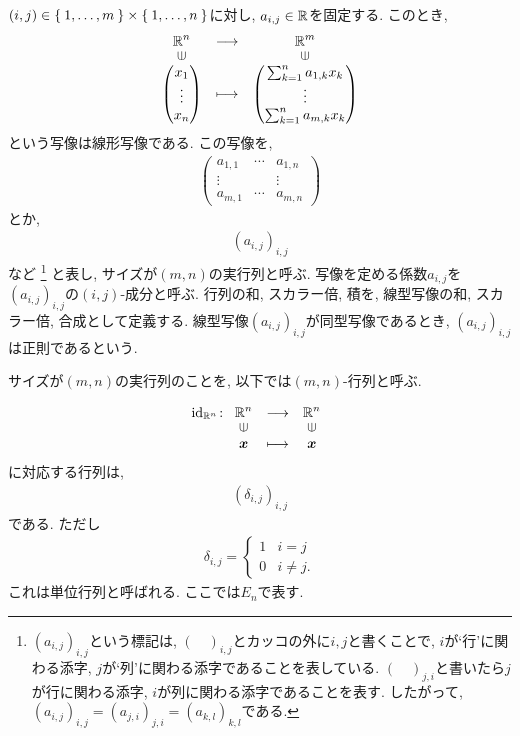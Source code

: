 \begin{definition}
$(i,j)\in\Set{1,\ldots,m}\times \Set{1,\ldots,n}$に対し,
$a_{i,j}\in\mathbb{R}$を固定する.
このとき,
\begin{align*}
  \Shazo{\RR^n}{\RR^m}
        {\begin{pmatrix}x_1\\\vdots\\x_n\end{pmatrix}}{\begin{pmatrix}\sum_{k=1}^n a_{1,k}x_k\\\vdots\\\sum_{k=1}^n a_{m,k}x_k\end{pmatrix}}
\end{align*}
という写像は線形写像である.
この写像を,
\begin{align*}
  \begin{pmatrix}
    a_{1,1}&\cdots &a_{1,n}\\
    \vdots& &\vdots\\
    a_{m,1}&\cdots &a_{m,n}
  \end{pmatrix}
\end{align*}
とか,
\begin{align*}
  (a_{i,j})_{i,j}
\end{align*}
など%
\footnote{$(a_{i,j})_{i,j}$という標記は, $(\quad)_{i,j}$とカッコの外に$i,j$と書くことで, $i$が`行'に関わる添字, $j$が`列'に関わる添字であることを表している.
$(\quad)_{j,i}$と書いたら$j$が行に関わる添字, $i$が列に関わる添字であることを表す.
したがって, $(a_{i,j})_{i,j}=(a_{j,i})_{j,i}=(a_{k,l})_{k,l}$である.}%
と表し,
サイズが$(m,n)$の実行列と呼ぶ.
写像を定める係数$a_{i,j}$を
$(a_{i,j})_{i,j}$の$(i,j)$-成分と呼ぶ.
行列の和, スカラー倍, 積を,
線型写像の和, スカラー倍, 合成として定義する.
線型写像$(a_{i,j})_{i,j}$が同型写像であるとき,
$(a_{i,j})_{i,j}$は正則であるという.
\end{definition}
\begin{remark}
  サイズが$(m,n)$の実行列のことを,
以下では$(m,n)$-行列と呼ぶ.
\end{remark}
\begin{remark}
  \begin{align*}
    \id_{\RR^n}\colon
    \Shazo{\RR^n}{\RR^n}
          {\xx}{\xx}
  \end{align*}
  に対応する行列は,
\begin{align*}
  (\delta_{i,j})_{i,j}
\end{align*}
である.
ただし
\begin{align*}
  \delta_{i,j}=
  \begin{cases}
    1&i=j\\
    0&i\neq j.
  \end{cases}
\end{align*}
これは単位行列と呼ばれる.
ここでは$E_n$で表す.
\end{remark}


